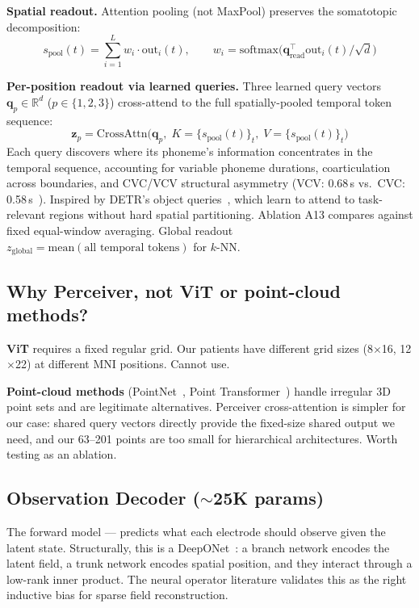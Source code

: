 \documentclass[11pt,letterpaper]{article}
\newcommand{\bfz}{\mathbf{z}}
\newcommand{\R}{\mathbb{R}}
\begin{document}
\textbf{Spatial readout.} Attention pooling (not MaxPool) preserves the somatotopic decomposition:
\begin{equation}
s_{\text{pool}}(t) = \sum_{i=1}^{L} w_i \cdot \text{out}_i(t), \qquad w_i = \text{softmax}\bigl(\mathbf{q}_{\text{read}}^\top \text{out}_i(t) / \sqrt{d}\bigr)
\end{equation}

\textbf{Per-position readout via learned queries.} Three learned query vectors $\mathbf{q}_p \in \R^d$ ($p \in \{1,2,3\}$) cross-attend to the full spatially-pooled temporal token sequence:
\begin{equation}
\bfz_p = \text{CrossAttn}\bigl(\mathbf{q}_p,\; K{=}\{s_{\text{pool}}(t)\}_{t},\; V{=}\{s_{\text{pool}}(t)\}_{t}\bigr)
\end{equation}
Each query discovers where its phoneme's information concentrates in the temporal sequence, accounting for variable phoneme durations, coarticulation across boundaries, and CVC/VCV structural asymmetry (VCV: 0.68\,s vs.\ CVC: 0.58\,s~\cite{duraivel2025}). Inspired by DETR's object queries~\cite{carion2020}, which learn to attend to task-relevant regions without hard spatial partitioning. Ablation A13 compares against fixed equal-window averaging. Global readout $z_{\text{global}} = \text{mean}(\text{all temporal tokens})$ for $k$-NN.


\subsection{Why Perceiver, not ViT or point-cloud methods?}

\textbf{ViT} requires a fixed regular grid. Our patients have different grid sizes (8$\times$16, 12$\times$22) at different MNI positions. Cannot use.

\textbf{Point-cloud methods} (PointNet~\cite{qi2017}, Point Transformer~\cite{zhao2021}) handle irregular 3D point sets and are legitimate alternatives. Perceiver cross-attention is simpler for our case: shared query vectors directly provide the fixed-size shared output we need, and our 63--201 points are too small for hierarchical architectures. Worth testing as an ablation.


\subsection{Observation Decoder (${\sim}$25K params)}\label{sec:obs-decoder}

The forward model --- predicts what each electrode should observe given the latent state. Structurally, this is a DeepONet~\cite{lu2021}: a branch network encodes the latent field, a trunk network encodes spatial position, and they interact through a low-rank inner product. The neural operator literature validates this as the right inductive bias for sparse field reconstruction.
\end{document}
